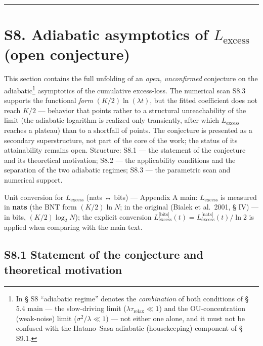 \documentclass[pdflatex,sn-mathphys-ay]{sn-jnl}
\begin{document}
\begin{center}\rule{0.5\linewidth}{0.5pt}\end{center}



\section*{\texorpdfstring{S8. Adiabatic asymptotics of \(L_{\text{excess}}\) (open conjecture)}{S8. Adiabatic asymptotics of L\_\{\textbackslash text\{excess\}\} (open conjecture)}}\label{s8.-adiabatic-asymptotics-of-l_textexcess-open-conjecture}



This section contains the full unfolding of an \emph{open, unconfirmed} conjecture on the adiabatic\footnote{In § S8 ``adiabatic regime'' denotes the \emph{combination} of both conditions of § 5.4 main --- the slow-driving limit (\(\lambda\tau_{\text{relax}} \ll 1\)) and the OU-concentration (weak-noise) limit (\(\sigma^2/\lambda \ll 1\)) --- not either one alone, and it must not be confused with the Hatano--Sasa adiabatic (housekeeping) component of § S9.1.} asymptotics of the cumulative excess-loss. The numerical scan S8.3 supports the functional \emph{form} \((K/2)\ln(\lambda t)\), but the fitted coefficient does not reach \(K/2\) --- behavior that points rather to a structural unreachability of the limit (the adiabatic logarithm is realized only transiently, after which \(L_{\text{excess}}\) reaches a plateau) than to a shortfall of points. The conjecture is presented as a secondary superstructure, not part of the core of the work; the status of its attainability remains open. Structure: S8.1 --- the statement of the conjecture and its theoretical motivation; S8.2 --- the applicability conditions and the separation of the two adiabatic regimes; S8.3 --- the parametric scan and numerical support.



Unit conversion for \(L_{\text{excess}}\) (nats ↔ bits) --- Appendix A main: \(L_{\text{excess}}\) is measured in \textbf{nats} (the BNT form \((K/2)\ln N\); in the original (Bialek et al.~2001, § IV) --- in bits, \((K/2)\log_2 N\)); the explicit conversion \(L_{\text{excess}}^{\text{[bits]}}(t) = L_{\text{excess}}^{\text{[nats]}}(t)/\ln 2\) is applied when comparing with the main text.



\subsection*{S8.1 Statement of the conjecture and theoretical motivation}\label{s8.1-statement-of-the-conjecture-and-theoretical-motivation}
\end{document}

